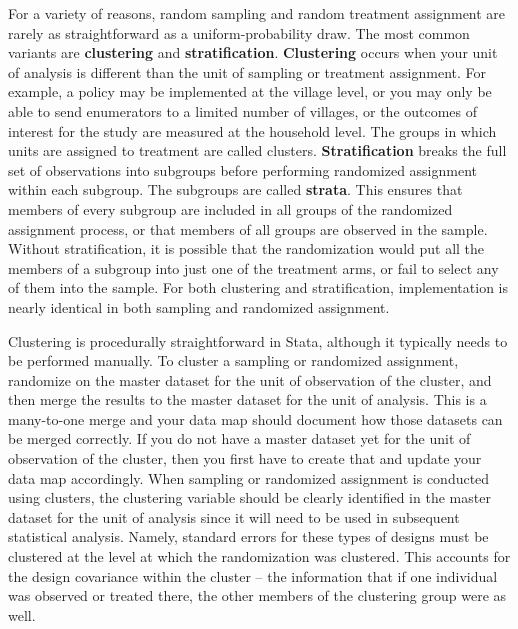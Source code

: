 For a variety of reasons, random sampling and random treatment assignment
are rarely as straightforward as a uniform-probability draw.
The most common variants are \textbf{clustering} and \textbf{stratification}.\cite{athey2017econometrics}
\textbf{Clustering} occurs when your unit of analysis is different
than the unit of sampling or treatment assignment.
For example, a policy may be implemented at the village level,
or you may only be able to send enumerators to a limited number of villages,
or the outcomes of interest for the study are measured at the household level.
The groups in which units are assigned to treatment are called clusters.
\textbf{Stratification} breaks the full set of observations into subgroups
before performing randomized assignment within each subgroup.
The subgroups are called \textbf{strata}.
This ensures that members of every subgroup
are included in all groups of the randomized assignment process,
or that members of all groups are observed in the sample.
Without stratification, it is possible that the randomization
would put all the members of a subgroup into just one of the treatment arms,
or fail to select any of them into the sample.
For both clustering and stratification,
implementation is nearly identical in both sampling and randomized assignment.

Clustering is procedurally straightforward in Stata,
although it typically needs to be performed manually.
To cluster a sampling or randomized assignment,
randomize on the master dataset for the unit of observation of the cluster,
and then merge the results to the master dataset for the unit of analysis.
This is a many-to-one merge and your data map should document
how those datasets can be merged correctly.
If you do not have a master dataset yet for the unit of observation of the cluster,
then you first have to create that and update your data map accordingly.
When sampling or randomized assignment is conducted using clusters,
the clustering variable should be clearly identified in the master dataset
for the unit of analysis
since it will need to be used in subsequent statistical analysis.
Namely, standard errors for these types of designs must be clustered
at the level at which the randomization was clustered.
This accounts for the design covariance within the cluster --
the information that if one individual was observed or treated there,
the other members of the clustering group were as well.

